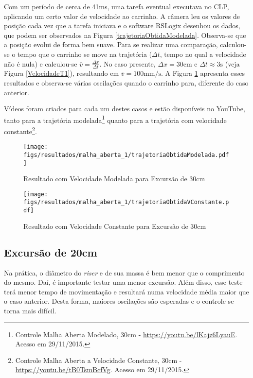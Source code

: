 Com um período de cerca de 41ms, uma tarefa eventual executava no CLP, aplicando um certo valor de velocidade ao carrinho. A câmera leu os valores de posição cada vez que a tarefa iniciava e o software RSLogix desenhou os dados, que podem ser observados na Figura \ref{trajetoriaObtidaModelada}. Observa-se que a posição evolui de forma bem suave. Para se realizar uma comparação, calculou-se o tempo que o carrinho se move na trajetória ($\Delta t$, tempo no qual a velocidade não é nula) e calculou-se $\overline{v} = \frac{\Delta x}{\Delta t}$. No caso presente, $\Delta x = 30\mathrm{cm}$ e $\Delta t \approx 3\mathrm{s}$ (veja Figura \ref{VelocidadeT1}), resultando em $\overline{v} = 100\mathrm{mm}/\mathrm{s}$. A Figura \ref{trajetoriaObtidaVConstante} apresenta esses resultados e observa-se várias oscilações quando o carrinho para, diferente do caso anterior.

Vídeos foram criados para cada um destes casos e estão disponíveis no YouTube{\sffamily\textregistered\textcopyright}, tanto para a trajetória modelada\footnote{Controle Malha Aberta Modelado, 30cm - \url{https://youtu.be/lKajz6LyauE}. Acesso em 29/11/2015.} quanto para a trajetória com velocidade constante\footnote{Controle Malha Aberta a Velocidade Constante, 30cm - \url{https://youtu.be/tB0TsmBcfVg}. Acesso em 29/11/2015.}.

\begin{figure}[!htb]
    \centering
    \begin{minipage}{.45\textwidth}
        \centering
        \texttt{[image: figs/resultados/malha\_aberta\_1/trajetoriaObtidaModelada.pdf]}
        \caption{Resultado com Velocidade Modelada para Excursão de 30cm}
        \label{trajetoriaObtidaModelada}
    \end{minipage}%
    \hspace{0.1cm}
    \begin{minipage}{0.45\textwidth}
        \centering
        \texttt{[image: figs/resultados/malha\_aberta\_1/trajetoriaObtidaVConstante.pdf]}
        \caption{Resultado com Velocidade Constante para Excursão de 30cm}
        \label{trajetoriaObtidaVConstante}
    \end{minipage}
\end{figure}

\subsection{Excursão de 20cm}
Na prática, o diâmetro do \textit{riser} e de sua massa é bem menor que o comprimento do mesmo. Daí, é importante testar uma menor excursão. Além disso, esse teste terá menor tempo de movimentação e resultará numa velocidade média maior que o caso anterior. Desta forma, maiores oscilações são esperadas e o controle se torna mais difícil.

